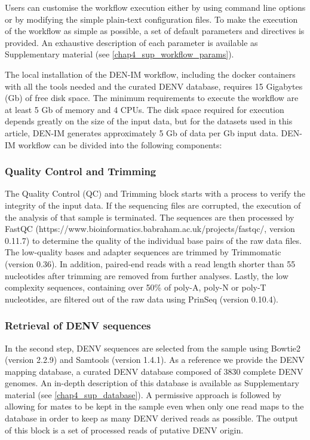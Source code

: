 Users can customise the workflow execution either by using command line options or by modifying the simple plain-text configuration files. To make the execution of the workflow as simple as possible, a set of default parameters and directives is provided. An exhaustive description of each parameter is available as Supplementary material (see \ref{chap4_sup_workflow_params}).

The local installation of the DEN-IM workflow, including the docker containers with all the tools needed and the curated DENV database, requires 15 Gigabytes (Gb) of free disk space. The minimum requirements to execute the workflow are at least 5 Gb of memory and 4 CPUs. The disk space required for execution depends greatly on the size of the input data, but for the datasets used in this article, DEN-IM generates approximately 5 Gb of data per Gb input data.
DEN-IM workflow can be divided into the following components:

\subsubsection{Quality Control and Trimming}

The Quality Control (QC) and Trimming block starts with a process to verify the integrity of the input data. If the sequencing files are corrupted, the execution of the analysis of that sample is terminated. The sequences are then processed by FastQC (https://www.bioinformatics.babraham.ac.uk/projects/fastqc/, version 0.11.7) to determine the quality of the individual base pairs of the raw data files. The low-quality bases and adapter sequences are trimmed by Trimmomatic \citep{schmieder_quality_2011} (version 0.36). In addition, paired-end reads with a read length shorter than 55 nucleotides after trimming are removed from further analyses. Lastly, the low complexity sequences, containing over 50\% of poly-A, poly-N or poly-T nucleotides, are filtered out of the raw data using PrinSeq \citep{schmieder_quality_2011} (version 0.10.4).

\subsubsection{Retrieval of DENV sequences}

In the second step, DENV sequences are selected from the sample using Bowtie2 \citep{langmead_fast_2012} (version 2.2.9) and Samtools \citep{langmead_fast_2012} (version 1.4.1). As a reference we provide the DENV mapping database, a curated DENV database composed of 3830 complete DENV genomes. An in-depth description of this database is available as Supplementary material (see \ref{chap4_sup_database}). A permissive approach is followed by allowing for mates to be kept in the sample even when only one read maps to the database in order to keep as many DENV derived reads as possible. The output of this block is a set of processed reads of putative DENV origin.

